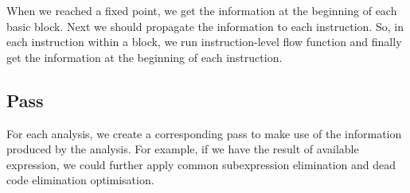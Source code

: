 \documentclass[paper=a4, fontsize=11pt]{scrartcl}
\numberwithin{equation}{section}		%
\numberwithin{figure}{section}			%
\numberwithin{table}{section}				%
\begin{document}
When we reached a fixed point, we get the information at the beginning of each basic block. Next we should propagate the information to each instruction. So, in each instruction within a block, we run instruction-level flow function and finally get the information at the beginning of each instruction.

\subsection{Pass}

For each analysis, we create a corresponding pass to make use of the information produced by the analysis. For example, if we have the result of available expression, we could further apply common subexpression elimination and dead code elimination optimisation. 







\end{document}
